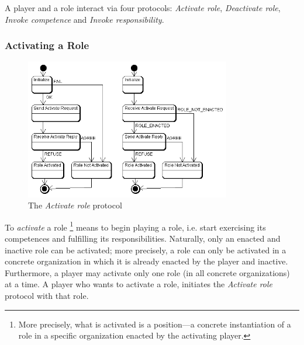 A player and a role interact via four protocols: \textit{Activate role}, \textit{Deactivate role}, \textit{Invoke competence} and \textit{Invoke responsibility}.

\subsubsection{Activating a Role}
\label{section:activating-a-role}

\begin{figure}[ht]
	\centering
	\includegraphics[width=0.8\textwidth]{images/thespian/activate-role-protocol.png}
	\caption{The \textit{Activate role} protocol}
	\label{figure:thespian-activate-role-protocol}
\end{figure}

To \textit{activate} a role
\footnote{More precisely, what is activated is a position---a concrete instantiation of a role in a specific organization enacted by the activating player.} means to begin playing a role, i.e. start exercising its competences and fulfilling its responsibilities.
Naturally, only an enacted and inactive role can be activated; more precisely, a role can only be activated in a concrete organization in which it is already enacted by the player and inactive.
Furthermore, a player may activate only one role (in all concrete organizations) at a time.
A player who wants to activate a role, initiates the \textit{Activate role} protocol with that role.

